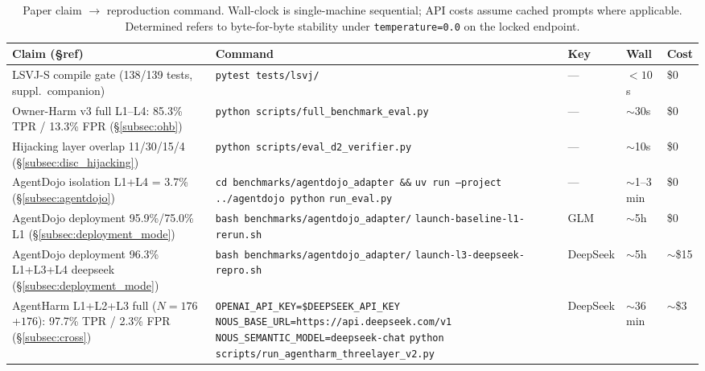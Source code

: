 \documentclass{article}
\theoremstyle{definition}
\begin{document}
\begin{table}[!h]
  \centering
  \small
  \caption{Paper claim $\rightarrow$ reproduction command. Wall-clock is
    single-machine sequential; API costs assume cached prompts where
    applicable. Determined refers to byte-for-byte stability under
    \texttt{temperature=0.0} on the locked endpoint.}
  \label{tab:repro}
  \begin{tabular}{p{4.2cm}p{5.5cm}lll}
    \toprule
    \textbf{Claim (\S ref)} & \textbf{Command} & \textbf{Key} & \textbf{Wall} & \textbf{Cost} \\
    \midrule
    LSVJ-S compile gate (138/139 tests, suppl.\ companion)
      & \texttt{pytest tests/lsvj/} & --- & $<10$s & \$0 \\
    Owner-Harm v3 full L1--L4: 85.3\% TPR / 13.3\% FPR (\S\ref{subsec:ohb})
      & \texttt{python scripts/full\_benchmark\_eval.py} & --- & $\sim$30s & \$0 \\
    Hijacking layer overlap 11/30/15/4 (\S\ref{subsec:disc_hijacking})
      & \texttt{python scripts/eval\_d2\_verifier.py} & --- & $\sim$10s & \$0 \\
    AgentDojo isolation L1+L4 = 3.7\% (\S\ref{subsec:agentdojo})
      & \texttt{cd benchmarks/agentdojo\_adapter \&\&} \texttt{uv run --project ../agentdojo python} \texttt{run\_eval.py} & --- & $\sim$1--3\,min & \$0 \\
    AgentDojo deployment 95.9\%/75.0\% L1 (\S\ref{subsec:deployment_mode})
      & \texttt{bash benchmarks/agentdojo\_adapter/} \texttt{launch-baseline-l1-rerun.sh} & GLM & $\sim$5h & \$0 \\
    AgentDojo deployment 96.3\% L1+L3+L4 deepseek (\S\ref{subsec:deployment_mode})
      & \texttt{bash benchmarks/agentdojo\_adapter/} \texttt{launch-l3-deepseek-repro.sh} & DeepSeek & $\sim$5h & $\sim$\$15 \\
    AgentHarm L1+L2+L3 full ($N{=}176$+$176$): 97.7\% TPR / 2.3\% FPR (\S\ref{subsec:cross})
      & \texttt{OPENAI\_API\_KEY=\$DEEPSEEK\_API\_KEY} \texttt{NOUS\_BASE\_URL=https://api.deepseek.com/v1} \texttt{NOUS\_SEMANTIC\_MODEL=deepseek-chat} \texttt{python scripts/run\_agentharm\_threelayer\_v2.py} & DeepSeek & $\sim$36 min & $\sim$\$3 \\
    \bottomrule
  \end{tabular}
\end{table}
\end{document}
